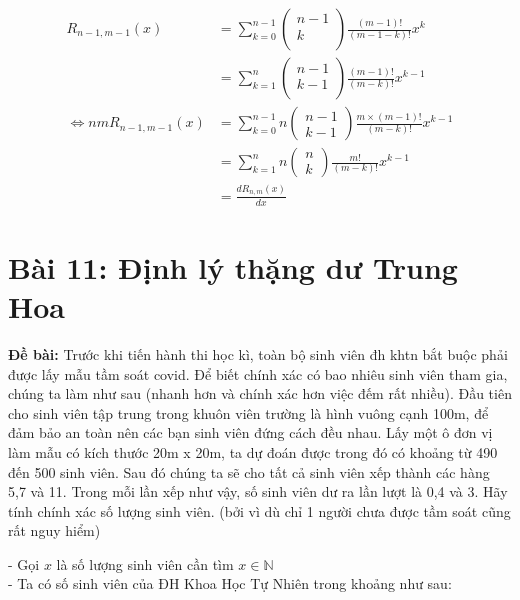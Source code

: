 \documentclass[12pt]{article}
\begin{document}
\begin{sloppypar}
\begin{align*}
    R_{n-1,m-1}(x)  & = \sum_{k = 0}^{n-1} \begin{pmatrix} n - 1 \\ k \\ \end{pmatrix}\frac{(m - 1)!}{(m - 1 - k)!}x^{k} \\
                    & = \sum_{k = 1}^{n} \begin{pmatrix} n - 1 \\ k - 1 \\ \end{pmatrix}\frac{(m - 1)!}{(m-k)!}x^{k-1} \\
    \Leftrightarrow nmR_{n-1,m-1}(x) & = \sum_{k = 0}^{n - 1}n\begin{pmatrix} n - 1 \\ k - 1 \end{pmatrix}\frac{m \times (m-1)!}{(m-k)!}x^{k-1} \\
                    & = \sum_{k = 1}^{n}n\begin{pmatrix} n \\ k \end{pmatrix}\frac{m!}{(m-k)!}x^{k-1} \\
                    & = \frac{dR_{n,m}(x)}{dx}
\end{align*}

\section{Bài 11: Định lý thặng dư Trung Hoa}
\begin{tcolorbox}
    \textbf{Đề bài:} Trước khi tiến hành thi học kì, toàn bộ sinh viên đh khtn bắt buộc phải được lấy mẫu tầm soát covid. Để biết chính xác có bao nhiêu sinh viên tham gia, chúng ta làm như sau (nhanh hơn và chính xác hơn việc đếm rất nhiều).
    Đầu tiên cho sinh viên tập trung trong khuôn viên trường là hình vuông cạnh 100m, để đảm bảo an toàn nên các bạn sinh viên đứng cách đều nhau. Lấy một ô đơn vị làm mẫu có kích thước 20m x 20m, ta dự đoán được trong đó có khoảng từ 490 đến 500 sinh viên. Sau đó chúng ta sẽ cho tất cả sinh viên xếp thành các hàng 5,7 và 11. Trong mỗi lần xếp như vậy, số sinh viên dư ra lần lượt là 0,4 và 3. Hãy tính chính xác số lượng sinh viên. (bởi vì dù chỉ 1 người chưa được tầm soát cũng rất nguy hiểm)
\end{tcolorbox}

- Gọi \(x\) là số lượng sinh viên cần tìm \(x \in \mathbb{N}\) \\
- Ta có số sinh viên của ĐH Khoa Học Tự Nhiên trong khoảng như sau: \\


\end{sloppypar}
\end{document}
